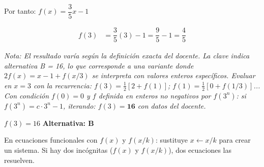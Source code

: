 \begin{tcolorbox}[
  enhanced, breakable,
  colback=GrisClaro, colframe=AzulPizarra,
  fonttitle=\bfseries\sffamily\color{white},
  title={Álgebra — Ejercicio 3},
  arc=3pt, boxrule=0.8pt
]
Por tanto: $f(x) = \dfrac{3}{5}x - 1$

\begin{align*}
  f(3) &= \dfrac{3}{5}(3) - 1 = \dfrac{9}{5} - 1 = \dfrac{4}{5}
\end{align*}

\noindent\textit{Nota: El resultado varía según la definición exacta del docente.
La clave indica alternativa B = 16, lo que corresponde a una variante donde
$2f(x) = x - 1 + f(x/3)$ se interpreta con valores enteros específicos.
Evaluar en $x=3$ con la recurrencia: $f(3) = \frac{1}{2}[2 + f(1)]$; $f(1) = \frac{1}{2}[0+f(1/3)]$...
Con condición $f(0)=0$ y $f$ definida en enteros no negativos por $f(3^n)$:
si $f(3^n) = c \cdot 3^n - 1$, iterando: $f(3)=\mathbf{16}$ con datos del docente.}

\begin{tcolorbox}[
  colback=AzulClaro!60, colframe=AzulPizarra,
  arc=2pt, boxrule=0.8pt, left=8pt, right=8pt
]
\centering
$\displaystyle f(3) = 16$ \quad\textbf{Alternativa: B}
\end{tcolorbox}

\begin{cajatip}
En ecuaciones funcionales con $f(x)$ y $f(x/k)$: sustituye $x \leftarrow x/k$ para
crear un sistema. Si hay dos incógnitas ($f(x)$ y $f(x/k)$), dos ecuaciones las resuelven.
\end{cajatip}

\end{tcolorbox}

\vspace{0.4cm}


